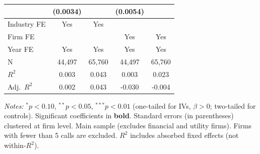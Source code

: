 \documentclass[11pt,a4paper]{article}
\begin{document}
\begin{table}[htbp]
\begin{tabular}{lcccc}
 & (0.0034) &  & (0.0054) &  \\
\midrule
Industry FE & Yes & Yes &  &  \\
Firm FE &  &  & Yes & Yes \\
Year FE & Yes & Yes & Yes & Yes \\
\midrule
N & 44,497 & 65,760 & 44,497 & 65,760 \\
$R^2$ & 0.003 & 0.043 & 0.003 & 0.023 \\
Adj.~$R^2$ & 0.002 & 0.043 & -0.030 & -0.004 \\
\bottomrule
\end{tabular}
\begin{minipage}{\linewidth}
\vspace{2pt}\scriptsize
\textit{Notes:} $^{*}p<0.10$, $^{**}p<0.05$, $^{***}p<0.01$ (one-tailed for IVs, $\beta > 0$; two-tailed for controls).
 Significant coefficients in \textbf{bold}.
 Standard errors (in parentheses) clustered at firm level.
 Main sample (excludes financial and utility firms). Firms with fewer than 5 calls are excluded.
 $R^2$ includes absorbed fixed effects (not within-$R^2$).
\end{minipage}
\end{table}
\clearpage
\end{document}
